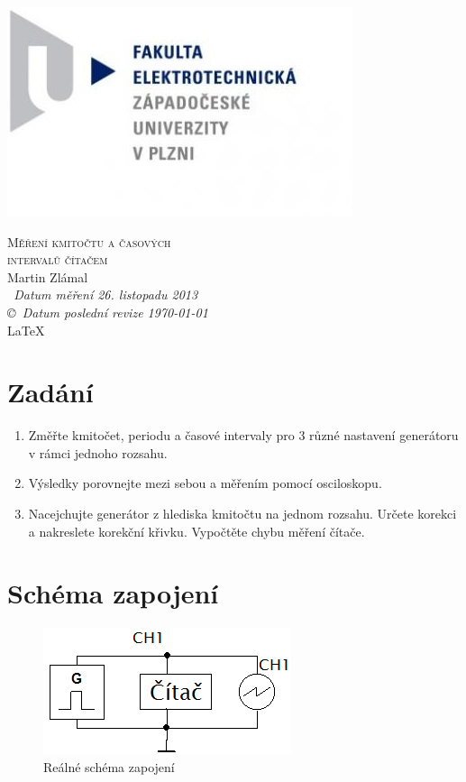\documentclass[12pt]{article} %
\begin{document}
\begin{titlepage}
	\includegraphics[scale=0.7]{logo.jpg}
	\vspace*{\fill}
	\begin{center}
		\textsc{\LARGE Měření kmitočtu a časových\\intervalů čítačem}\\[1cm]
		Martin Zlámal \\[1cm]
		{\small\em \ Datum měření 26. listopadu 2013 } \\
		{\small\em \copyright \ Datum poslední revize \today } \\
		\LaTeX
	\end{center}
	\vspace*{\fill}
\end{titlepage}
\newpage

\section{Zadání}
\begin{enumerate}
\item Změřte kmitočet, periodu a časové intervaly pro 3 různé nastavení generátoru
v rámci jednoho rozsahu.
\item Výsledky porovnejte mezi sebou a měřením pomocí osciloskopu.
\item Nacejchujte generátor z hlediska kmitočtu na jednom rozsahu. Určete korekci a
nakreslete korekční křivku. Vypočtěte chybu měření čítače.
\end{enumerate}

\section{Schéma zapojení}
\begin{figure}[H]
\center
\includegraphics[scale=1]{schema.png}
\caption{Reálné schéma zapojení}
\end{figure}
\end{document}
